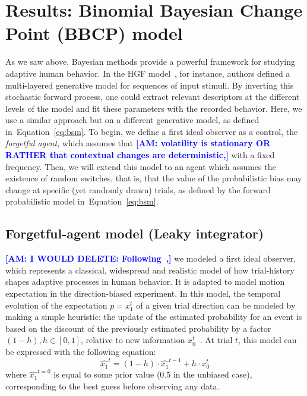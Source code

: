 \documentclass[12pt,english]{article}%
\newcommand{\eql}[1]{\begin{equation}#1\end{equation}}
\newcommand{\citep}[1]{\parencite{#1}}
\newcommand{\citet}[1]{\textcite{#1}}
\newcommand{\seeEq}[1]{Equation~\ref{eq:#1}}
\newcommand{\AM}[1]{\textbf{\textcolor{blue}{[AM: #1]}}}
\begin{document}
\section{Results: Binomial Bayesian Change Point (BBCP) model}
\label{sec:bayesian_change_point}
%
%
As we saw above, Bayesian methods provide a powerful framework for studying adaptive human behavior.
In the HGF model~\citep{Mathys11}, for instance,
authors defined a multi-layered generative model for
sequences of input stimuli.
By inverting this stochastic forward process,
one could extract relevant descriptors at the different levels of the model
and fit these parameters with the recorded behavior.
Here, we use a similar approach but on a different generative model,
as defined in~\seeEq{bsm}.
To begin, we define a first ideal observer as a control, the \textit{forgetful agent},
which assumes that \AM{volatility is stationary OR RATHER that contextual changes are deterministic,} with a fixed frequency.
Then, we will extend this model to an agent
which assumes the existence of random switches, that is,
that the value of the probabilistic bias may change
at specific (yet randomly drawn) trials,
as defined by the forward probabilistic model in~\seeEq{bsm}.
%
\subsection{Forgetful-agent model (Leaky integrator)}%
\AM{I WOULD DELETE: Following~\citet{Maus2015},}
we modeled a first ideal observer,
which represents a classical, widespread and
realistic model of how trial-history shapes
adaptive processes in human behavior.
It is adapted to model motion expectation in the direction-biased experiment.
In this model, the temporal evolution of the expectation $p=x_1^t$ of a given trial direction can be modeled by making a simple heuristic:
the update of the estimated probability for an event is based
on the discount of the previously estimated probability
by a factor $(1 - h), h \in [0, 1]$, relative to new information $x_0^t$~\citep{Anderson2006}.
At trial $t$, this model can be expressed with the following equation:
\eql{
\hat{x_1}^{t} = (1 - h) \cdot \hat{x_1}^{t-1} + h \cdot x_0^t
\label{eq:leaky}}
where $\hat{x_1}^{t=0}$ is equal to some prior value ($0.5$ in the unbiased case),
corresponding to the best guess before observing any data.
\end{document}
